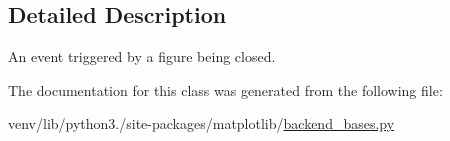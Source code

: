 \subsection{Detailed Description}
\begin{DoxyVerb}An event triggered by a figure being closed.\end{DoxyVerb}
 

The documentation for this class was generated from the following file\+:\begin{DoxyCompactItemize}
\item 
venv/lib/python3./site-\/packages/matplotlib/\hyperlink{backend__bases_8py}{backend\+\_\+bases.\+py}\end{DoxyCompactItemize}
